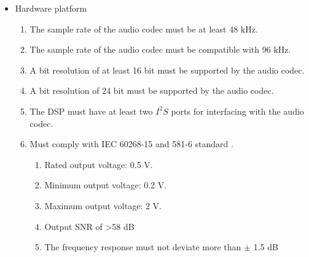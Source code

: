 \begin{itemize}
\item Hardware platform
\begin{enumerate}
\item [\textlabel{4}{samplerate44}] The sample rate of the audio codec must be at least 48 kHz.\\
\item [\textlabel{5}{samplerate96}] The sample rate of the audio codec must be compatible with 96 kHz.\\
\item [\textlabel{6}{resolution16}]  A bit resolution of  at least 16 bit must be supported by the audio codec.\\
\item [\textlabel{7}{resolution}]  A bit resolution of 24 bit must be supported by the audio codec.\\
\item [\textlabel{8}{I2S}] The DSP must have at least two $I^2S$ ports for interfacing with the audio codec.\\
\item [\textlabel{9}{IEC}] Must comply with IEC 60268-15 and 581-6 standard \citep{IEC60268}.
\begin{enumerate}
\item Rated output voltage: 0.5 V.
\item Minimum output voltage: 0.2 V.
\item Maximum output voltage: 2 V.
\item Output SNR of >58 dB
\item The frequency response must not deviate more than $\pm$ 1.5 dB
\end{enumerate}
\end{enumerate}
\end{itemize}


